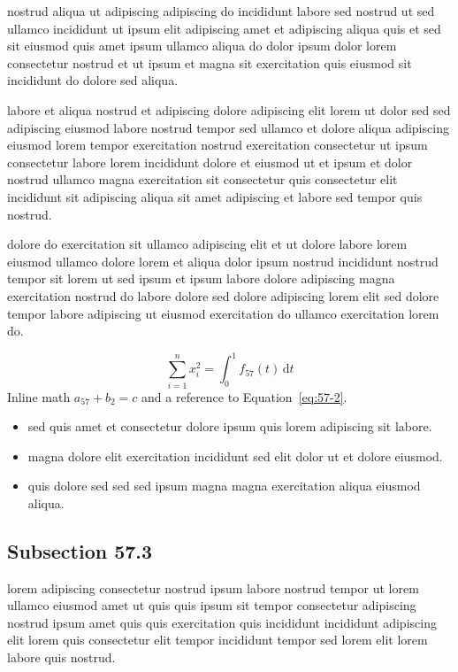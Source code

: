 \documentclass{article}
\begin{document}
nostrud aliqua ut adipiscing adipiscing do incididunt labore sed nostrud ut sed ullamco incididunt ut ipsum elit adipiscing amet et adipiscing aliqua quis et sed sit eiusmod quis amet ipsum ullamco aliqua do dolor ipsum dolor lorem consectetur nostrud et ut ipsum et magna sit exercitation quis eiusmod sit incididunt do dolore sed aliqua.

labore et aliqua nostrud et adipiscing dolore adipiscing elit lorem ut dolor sed sed adipiscing eiusmod labore nostrud tempor sed ullamco et dolore aliqua adipiscing eiusmod lorem tempor exercitation nostrud exercitation consectetur ut ipsum consectetur labore lorem incididunt dolore et eiusmod ut et ipsum et dolor nostrud ullamco magna exercitation sit consectetur quis consectetur elit incididunt sit adipiscing aliqua sit amet adipiscing et labore sed tempor quis nostrud.

dolore do exercitation sit ullamco adipiscing elit et ut dolore labore lorem eiusmod ullamco dolore lorem et aliqua dolor ipsum nostrud incididunt nostrud tempor sit lorem ut sed ipsum et ipsum labore dolore adipiscing magna exercitation nostrud do labore dolore sed dolore adipiscing lorem elit sed dolore tempor labore adipiscing ut eiusmod exercitation do ullamco exercitation lorem do.

\begin{equation}\label{eq:57-2}
  \sum_{i=1}^{n} x_i^{2} = \int_0^1 f_{57}(t)\,\mathrm{d}t
\end{equation}
Inline math $a_{57} + b_{2} = c$ and a reference to Equation~\eqref{eq:57-2}.

\begin{itemize}
  \item sed quis amet et consectetur dolore ipsum quis lorem adipiscing sit labore.
  \item magna dolore elit exercitation incididunt sed elit dolor ut et dolore eiusmod.
  \item quis dolore sed sed sed ipsum magna magna exercitation aliqua eiusmod aliqua.
\end{itemize}

\subsection{Subsection 57.3}\label{sec:57-3}
lorem adipiscing consectetur nostrud ipsum labore nostrud tempor ut lorem ullamco eiusmod amet ut quis quis ipsum sit tempor consectetur adipiscing nostrud ipsum amet quis quis exercitation quis incididunt incididunt adipiscing elit lorem quis consectetur elit tempor incididunt tempor sed lorem elit lorem labore quis nostrud.
\end{document}
